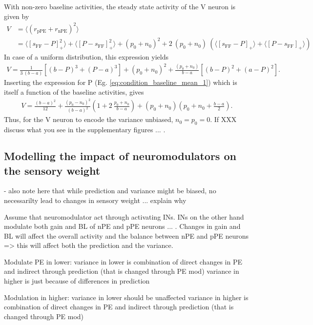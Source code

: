 \documentclass[10pt,a4paper,draft]{article}
\begin{document}
With non-zero baseline activities, the steady state activity of the V neuron is given by
%
\begin{align}
\label{eq:condition_baseline_variance}
V &= \langle \left( r_\mathrm{pPE} + r_\mathrm{nPE} \right)^2 \rangle \\
&= \langle \left[ s_\mathrm{FF}-P\right]_+^2\rangle + \langle \left[ P-s_\mathrm{FF}\right]_+^2\rangle + (p_0 + n_0)^2 + 2\ (p_0 + n_0)\ \left( \langle \left[ s_\mathrm{FF}-P\right]_+\rangle + \langle \left[ P-s_\mathrm{FF}\right]_+ \rangle\right) \nonumber
\end{align}
%
In case of a uniform distribution, this expression yields
%
\begin{align}
\label{eq:condition_baseline_variance_1}
V = \frac{1}{3\ (b-a)} \left[ (b-P)^3 + (P-a)^3\right] + (p_0 + n_0)^2 + \frac{(p_0 + n_0)}{b-a} \left[ (b-P)^2 + (a-P)^2\right].
\end{align}
%
Inserting the expression for P (Eg. \ref{eq:condition_baseline_mean_1}) which is itself a function of the baseline activities, gives
%
\begin{align}
\label{eq:condition_baseline_variance_2}
V =  \frac{(b-a)^2}{12} + \frac{(p_0-n_0)^2}{(b-a)^2} \left( 1 + 2\ \frac{p_0+n_0}{b-a}\right) + (p_0 + n_0) \left( p_0 + n_0 + \frac{b-a}{2}\right).
\end{align}
%
Thus, for the V neuron to encode the variance unbiased, $n_0 = p_0 = 0$. If XXX discuss what you see in the supplementary figures ... .


\subsection{Modelling the impact of neuromodulators on the sensory weight}

- also note here that while prediction and variance might be biased, no necessarilty lead to changes in sensory weight ... explain why

Assume that neuromodulator act through activating INs. INs on the other hand modulate both gain and BL of nPE and pPE neurons ... . Changes in gain and BL will affect the overall activity and the balance between nPE and pPE neurons => this will affect both the prediction and the variance. 

Modulate PE in lower:
variance in lower is combination of direct changes in PE and indirect through prediction (that is changed through PE mod)
variance in higher is just because of differences in prediction


Modulation in higher:
variance in lower should be unaffected
variance in higher is combination of direct changes in PE and indirect through prediction (that is changed through PE mod)
\end{document}
